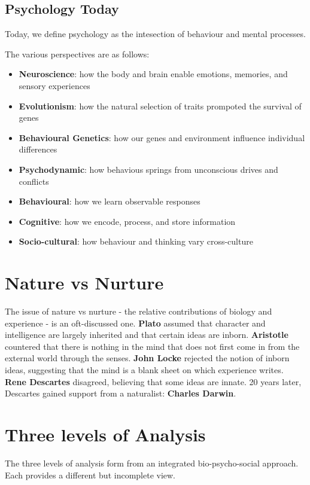 \documentclass[12pt]{article}
\begin{document}
\subsection*{Psychology Today}
Today, we define psychology as the intesection of behaviour and mental processes.

The various perspectives are as follows:
\begin{itemize}
\item {\bf Neuroscience}: how the body and brain enable emotions, memories, and sensory experiences
\item {\bf Evolutionism}: how the natural selection of traits prompoted the survival of genes
\item {\bf Behavioural Genetics}: how our genes and environment influence individual differences
\item {\bf Psychodynamic}: how behavious springs from unconscious drives and conflicts
\item {\bf Behavioural}: how we learn observable responses
\item {\bf Cognitive}: how we encode, process, and store information
\item {\bf Socio-cultural}: how behaviour and thinking vary cross-culture
\end{itemize}

\section*{Nature vs Nurture}
The issue of nature vs nurture - the relative contributions of biology and experience -  is an oft-discussed one. {\bf Plato} assumed that character and intelligence are largely inherited and that certain ideas are inborn. {\bf Aristotle} countered that there is nothing in the mind that does not first come in from the external world through the senses. {\bf John Locke} rejected the notion of inborn ideas, suggesting that the mind is a blank sheet on which experience writes. {\bf Rene Descartes} disagreed, believing that some ideas are innate. 20 years later, Descartes gained support from a naturalist: {\bf Charles Darwin}.

\section*{Three levels of Analysis}
The three levels of analysis form from an integrated bio-psycho-social approach. Each provides a different but incomplete view.
\end{document}
